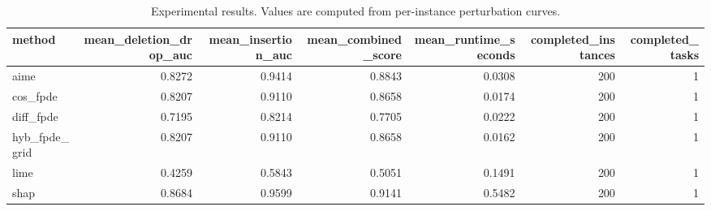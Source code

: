 \begin{table}[t]
\caption{Experimental results. Values are computed from per-instance perturbation curves.}
\label{tab:main_results_computed}
\centering
\begin{tabular}{lrrrrrr}
\toprule
method & mean\_deletion\_drop\_auc & mean\_insertion\_auc & mean\_combined\_score & mean\_runtime\_seconds & completed\_instances & completed\_tasks \\
\midrule
aime & 0.8272 & 0.9414 & 0.8843 & 0.0308 & 200 & 1 \\
cos\_fpde & 0.8207 & 0.9110 & 0.8658 & 0.0174 & 200 & 1 \\
diff\_fpde & 0.7195 & 0.8214 & 0.7705 & 0.0222 & 200 & 1 \\
hyb\_fpde\_grid & 0.8207 & 0.9110 & 0.8658 & 0.0162 & 200 & 1 \\
lime & 0.4259 & 0.5843 & 0.5051 & 0.1491 & 200 & 1 \\
shap & 0.8684 & 0.9599 & 0.9141 & 0.5482 & 200 & 1 \\
\bottomrule
\end{tabular}

\end{table}
